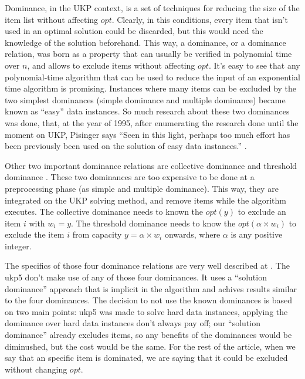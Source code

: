 \documentclass[runningheads,a4paper]{llncs}
\begin{document}
Dominance, in the UKP context, is a set of techniques for reducing the size of the item list without affecting \(opt\). Clearly, in this conditions, every item that isn't used in an optimal solution could be discarded, but this would need the knowledge of the solution beforehand. This way, a dominance, or a dominance relation, was born as a property that can usually be verified in polynomial time over \(n\), and allows to exclude items without affecting \(opt\). It's easy to see that any polynomial-time algorithm that can be used to reduce the input of an exponential time algorithm is promising. Instances where many items can be excluded by the two simplest dominances (simple dominance and multiple dominance) became known as ``easy'' data instances. So much research about these two dominances was done, that, at the year of 1995, after enumerating the research done until the moment on UKP, Pisinger says ``Seen in this light, perhaps too much effort has been previously been used on the solution of easy data instances.'' \cite[p. 20]{CPISINGER}.

Other two important dominance relations are collective dominance and threshold dominance \cite{CGAR} \cite{CPYA}. These two dominances are too expensive to be done at a preprocessing phase (as simple and multiple dominance). This way, they are integrated on the UKP solving method, and remove items while the algorithm executes. The collective dominance needs to known the \(opt(y)\) to exclude an item \(i\) with \(w_i = y\). The threshold dominance needs to know the \(opt(\alpha\times w_i)\) to exclude the item \(i\) from capacity \(y = \alpha\times w_i\) onwards, where \(\alpha\) is any positive integer.

The specifics of those four dominance relations are very well described at \cite{CPYA}. The ukp5 don't make use of any of those four dominances. It uses a ``solution dominance'' approach that is implicit in the algorithm and achives results similar to the four dominances. The decision to not use the known dominances is based on two main points: ukp5 was made to solve hard data instances, applying the dominance over hard data instances don't always pay off; our ``solution dominance'' already excludes items, so any benefits of the dominances would be diminushed, but the cost would be the same. For the rest of the article, when we say that an specific item is dominated, we are saying that it could be excluded without changing \(opt\).

\end{document}
